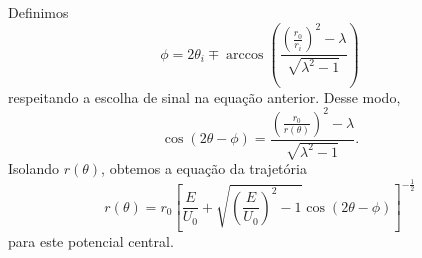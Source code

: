 Definimos
\begin{equation}
    \phi = 2\theta_i \mp \arccos{\left(\frac{\left(\frac{r_0}{r_i}\right)^2 - \lambda}{\sqrt{\lambda^2 - 1}}\right)}
\end{equation}
respeitando a escolha de sinal na equação anterior. Desse modo,
\begin{equation}
    \cos{(2\theta - \phi)} = \frac{\left(\frac{r_0}{r(\theta)}\right)^2-\lambda}{\sqrt{\lambda^2 - 1}}.
\end{equation}
Isolando \(r(\theta)\), obtemos a equação da trajetória
\begin{equation}
    r(\theta) = r_0\left[\frac{E}{U_0} + \sqrt{\left(\frac{E}{U_0}\right)^2 - 1}\cos{(2\theta - \phi)}\right]^{-\frac12}
\end{equation}
para este potencial central.
